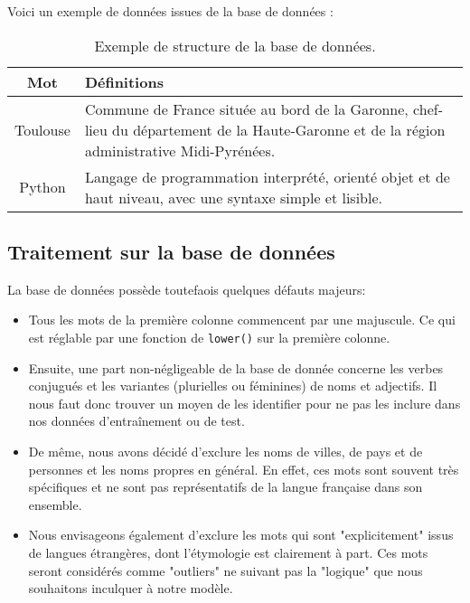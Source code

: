 \documentclass[french]{template}
\begin{document}
Voici un exemple de données issues de la base de données :

\begin{table}[h!]
    \centering
    \begin{tabular}{|c|p{10cm}|}
        \hline
        \textbf{Mot} & \textbf{Définitions}                                                                                                                       \\ \hline
        Toulouse     & Commune de France située au bord de la Garonne, chef-lieu du département de la Haute-Garonne et de la région administrative Midi-Pyrénées. \\ \hline
        Python       & Langage de programmation interprété, orienté objet et de haut niveau, avec une syntaxe simple et lisible.                                  \\ \hline
    \end{tabular}
    \caption{Exemple de structure de la base de données.}
\end{table}

\subsection{Traitement sur la base de données}

La base de données possède toutefaois quelques défauts majeurs:

\begin{itemize}
    \item Tous les mots de la première colonne commencent par une majuscule. Ce qui est réglable par une fonction de \texttt{lower()} sur la première colonne.
    \item Ensuite, une part non-négligeable de la base de donnée concerne les verbes conjugués et les variantes (plurielles ou féminines) de noms et adjectifs. Il nous faut donc trouver un moyen de les identifier pour ne pas les inclure dans nos données d'entraînement ou de test.
    \item De même, nous avons décidé d'exclure les noms de villes, de pays et de personnes et les noms propres en général. En effet, ces mots sont souvent très spécifiques et ne sont pas représentatifs de la langue française dans son ensemble.
    \item Nous envisageons également d'exclure les mots qui sont "explicitement" issus de langues étrangères, dont l'étymologie est clairement à part. Ces mots seront considérés comme "outliers" ne suivant pas la "logique" que nous souhaitons inculquer à notre modèle.
\end{itemize}
\end{document}
